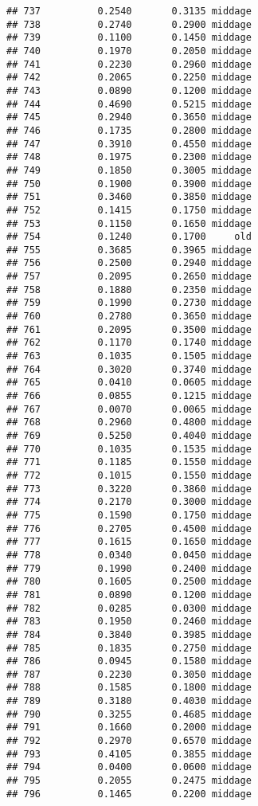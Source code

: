 \documentclass[
]{article}
\begin{document}
\begin{verbatim}
## 737          0.2540       0.3135 middage
## 738          0.2740       0.2900 middage
## 739          0.1100       0.1450 middage
## 740          0.1970       0.2050 middage
## 741          0.2230       0.2960 middage
## 742          0.2065       0.2250 middage
## 743          0.0890       0.1200 middage
## 744          0.4690       0.5215 middage
## 745          0.2940       0.3650 middage
## 746          0.1735       0.2800 middage
## 747          0.3910       0.4550 middage
## 748          0.1975       0.2300 middage
## 749          0.1850       0.3005 middage
## 750          0.1900       0.3900 middage
## 751          0.3460       0.3850 middage
## 752          0.1415       0.1750 middage
## 753          0.1150       0.1650 middage
## 754          0.1240       0.1700     old
## 755          0.3685       0.3965 middage
## 756          0.2500       0.2940 middage
## 757          0.2095       0.2650 middage
## 758          0.1880       0.2350 middage
## 759          0.1990       0.2730 middage
## 760          0.2780       0.3650 middage
## 761          0.2095       0.3500 middage
## 762          0.1170       0.1740 middage
## 763          0.1035       0.1505 middage
## 764          0.3020       0.3740 middage
## 765          0.0410       0.0605 middage
## 766          0.0855       0.1215 middage
## 767          0.0070       0.0065 middage
## 768          0.2960       0.4800 middage
## 769          0.5250       0.4040 middage
## 770          0.1035       0.1535 middage
## 771          0.1185       0.1550 middage
## 772          0.1015       0.1550 middage
## 773          0.3220       0.3860 middage
## 774          0.2170       0.3000 middage
## 775          0.1590       0.1750 middage
## 776          0.2705       0.4500 middage
## 777          0.1615       0.1650 middage
## 778          0.0340       0.0450 middage
## 779          0.1990       0.2400 middage
## 780          0.1605       0.2500 middage
## 781          0.0890       0.1200 middage
## 782          0.0285       0.0300 middage
## 783          0.1950       0.2460 middage
## 784          0.3840       0.3985 middage
## 785          0.1835       0.2750 middage
## 786          0.0945       0.1580 middage
## 787          0.2230       0.3050 middage
## 788          0.1585       0.1800 middage
## 789          0.3180       0.4030 middage
## 790          0.3255       0.4685 middage
## 791          0.1660       0.2000 middage
## 792          0.2970       0.6570 middage
## 793          0.4105       0.3855 middage
## 794          0.0400       0.0600 middage
## 795          0.2055       0.2475 middage
## 796          0.1465       0.2200 middage

\end{verbatim}
\end{document}
